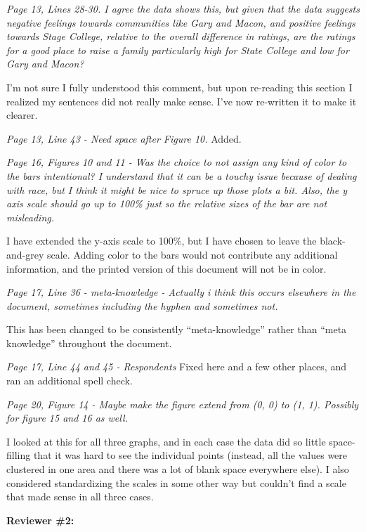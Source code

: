\documentclass[12pt]{article}
\begin{document}
\emph{Page 13, Lines 28-30. I agree the data shows this, but given that the data suggests negative feelings towards communities like Gary and Macon, and positive feelings towards Stage College, relative to the overall difference in ratings, are the ratings for a good place to raise a family particularly high for State College and low for Gary and Macon?} 

I'm not sure I fully understood this comment, but upon re-reading this section I realized my sentences did not really make sense. I've now re-written it to make it clearer. 

\emph{Page 13, Line 43 - Need space after Figure 10.} Added.

\emph{Page 16, Figures 10 and 11 - Was the choice to not assign any kind of color to the bars intentional? I understand that it can be a touchy issue because of dealing with race, but I think it might be nice to spruce up those plots a bit. Also, the y axis scale should go up to 100\% just so the relative sizes of the bar are not misleading.} 

I have extended the y-axis scale to 100\%, but I have chosen to leave the black-and-grey scale. Adding color to the bars would not contribute any additional information, and the printed version of this document will not be in color.

\emph{Page 17, Line 36 - meta-knowledge - Actually i think this occurs elsewhere in the document, sometimes including the hyphen and sometimes not.} 

This has been changed to be consistently ``meta-knowledge''  rather than ``meta knowledge'' throughout the document. 

\emph{Page 17, Line 44 and 45 - Respondents} Fixed here and a few other places, and ran an additional spell check.

\emph{Page 20, Figure 14 - Maybe make the figure extend from (0, 0) to (1, 1). Possibly for figure 15 and 16 as well.} 

I looked at this for all three graphs, and in each case the data did so little space-filling that it was hard to see the individual points (instead, all the values were clustered in one area and there was a lot of blank space everywhere else). I also considered standardizing the scales in some other way but couldn't find a scale that made sense in all three cases. 


\textbf{Reviewer \#2:}

\end{document}
